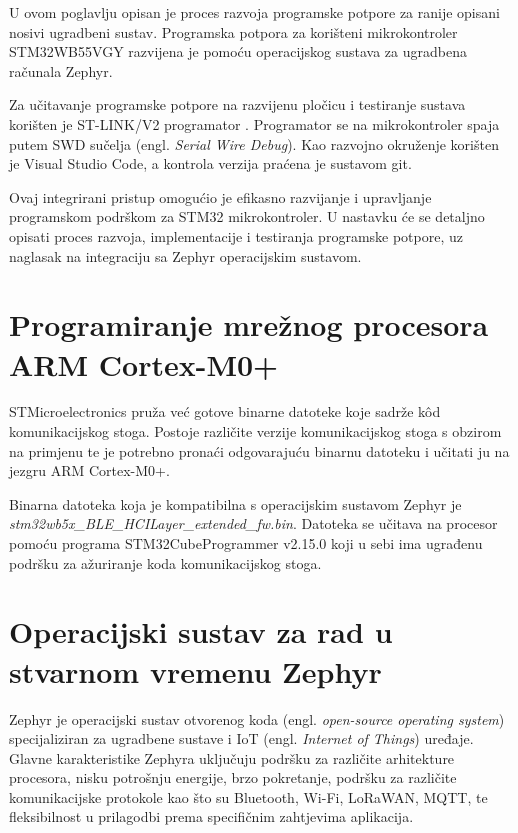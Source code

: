 \documentclass[../diplomski_rad.tex]{subfiles}
\begin{document}
\sloppy

\justifying

U ovom poglavlju opisan je proces razvoja programske potpore za ranije opisani nosivi ugradbeni sustav. 
Programska potpora za korišteni mikrokontroler STM32WB55VGY razvijena je pomoću operacijskog sustava 
za ugradbena računala Zephyr.

Za učitavanje programske potpore na razvijenu pločicu i testiranje sustava korišten je ST-LINK/V2 programator \cite{stm32programator}. 
Programator se na mikrokontroler spaja putem SWD sučelja (engl. \textit{Serial Wire Debug}). 
Kao razvojno okruženje korišten je Visual Studio Code, a kontrola verzija praćena je sustavom git.

Ovaj integrirani pristup omogućio je efikasno razvijanje i upravljanje programskom podrškom za STM32 mikrokontroler. 
U nastavku će se detaljno opisati proces razvoja, implementacije i testiranja programske potpore, 
uz naglasak na integraciju sa Zephyr operacijskim sustavom.

\section{Programiranje mrežnog procesora ARM Cortex-M0+}

STMicroelectronics pruža već gotove binarne datoteke \cite{kodovi_M0} koje sadrže k\^{o}d komunikacijskog stoga. 
Postoje različite verzije komunikacijskog stoga s obzirom na primjenu te je potrebno pronaći odgovarajuću 
binarnu datoteku i učitati ju na jezgru ARM Cortex-M0+.

Binarna datoteka koja je kompatibilna s operacijskim sustavom Zephyr je \textit{stm32wb5x\_BLE\_HCILayer\_extended\_fw.bin}.
Datoteka se učitava na procesor pomoću programa STM32CubeProgrammer v2.15.0 
koji u sebi ima ugrađenu podršku za ažuriranje koda komunikacijskog stoga. 

\section{Operacijski sustav za rad u stvarnom vremenu Zephyr}

Zephyr je operacijski sustav otvorenog koda (engl. \textit{open-source operating system}) specijaliziran za ugradbene sustave 
i IoT (engl. \textit{Internet of Things}) uređaje.
Glavne karakteristike Zephyra uključuju podršku za različite arhitekture procesora, 
nisku potrošnju energije, brzo pokretanje, podršku za različite komunikacijske protokole kao što su 
Bluetooth, Wi-Fi, LoRaWAN, MQTT, te fleksibilnost u prilagodbi prema specifičnim zahtjevima aplikacija.
\end{document}
